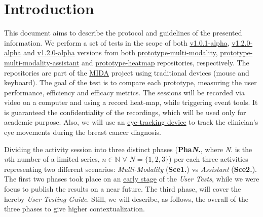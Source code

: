 
\section{Introduction}
\label{sec:sec001}

This document aims to describe the protocol and guidelines of the presented information. We perform a set of tests in the scope of both \hyperlink{https://github.com/MIMBCD-UI/prototype-multi-modality/releases/tag/v1.0.1-alpha}{v1.0.1-alpha}, \hyperlink{https://github.com/mida-project/prototype-multi-modality-assistant/releases/tag/v1.2.0-alpha}{v1.2.0-alpha} and \hyperlink{https://github.com/mida-project/prototype-heatmap/releases/tag/v1.2.0-alpha}{v1.2.0-alpha} versions from both \hyperlink{https://github.com/MIMBCD-UI/prototype-multi-modality}{prototype-multi-modality}, \hyperlink{https://github.com/mida-project/prototype-multi-modality-assistant}{prototype-multi-modality-assistant} and \hyperlink{https://github.com/mida-project/prototype-heatmap}{prototype-heatmap} repositories, respectively. The repositories are part of the \hyperlink{https://mida-project.github.io/}{MIDA} project using traditional devices (mouse and keyboard). The goal of the test is to compare each prototype, measuring the user performance, efficiency and efficacy metrics. The sessions will be recorded via video on a computer and using a record heat-map, while triggering event tools. It is guaranteed the confidentiality of the recordings, which will be used only for academic purpose. Also, we will use an \hyperlink{https://gaming.tobii.com/products/}{eye-tracking device} to track the clinician's eye movements during the breast cancer diagnosis.

Dividing the activity session into three distinct phases (\textbf{Pha\textit{N}.}, where \textit{N}. is the \textit{n}th number of a limited series, $n \in \mathbb{N}$ $\forall$ $N = \{1, 2, 3\}$) per each three activities representing two different scenarios: \textit{Multi-Modality} (\textbf{Sce1.}) vs \textit{Assistant} (\textbf{Sce2.}). The first two phases took place on an \hyperlink{https://github.com/MIMBCD-UI/testing-guide-breast/tree/master/samples/test_4}{early stage} of the \textit{User Tests}, while we were focus to publish the results on a near future. The third phase, will cover the hereby \textit{User Testing Guide}. Still, we will describe, as follows, the overall of the three phases to give higher contextualization.

